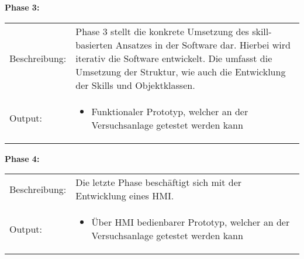 	\textbf{Phase 3:} \vspace{2mm} 
	\\
		\begin{tabularx}{\textwidth}{@{}>{}p{7em} X@{}}
			Beschreibung: & 
			Phase 3 stellt die konkrete Umsetzung des skill-basierten Ansatzes in der Software dar. Hierbei wird iterativ die Software entwickelt. Die umfasst die Umsetzung der Struktur, wie auch die Entwicklung der Skills und Objektklassen.  
			\\
	
			Output: & 
			\begin{itemize}
				\item Funktionaler Prototyp, welcher an der Versuchsanlage getestet werden kann
			\end{itemize}
		\end{tabularx}
	
	\textbf{Phase 4:} \vspace{2mm} 
	\\
		\begin{tabularx}{\textwidth}{@{}>{}p{7em} X@{}}
			Beschreibung: & 
			Die letzte Phase beschäftigt sich mit der Entwicklung eines HMI.  
			\\
			
			Output: & 
			\begin{itemize}
				\item Über HMI bedienbarer Prototyp, welcher an der Versuchsanlage getestet werden kann
			\end{itemize}
		\end{tabularx}
	
	
